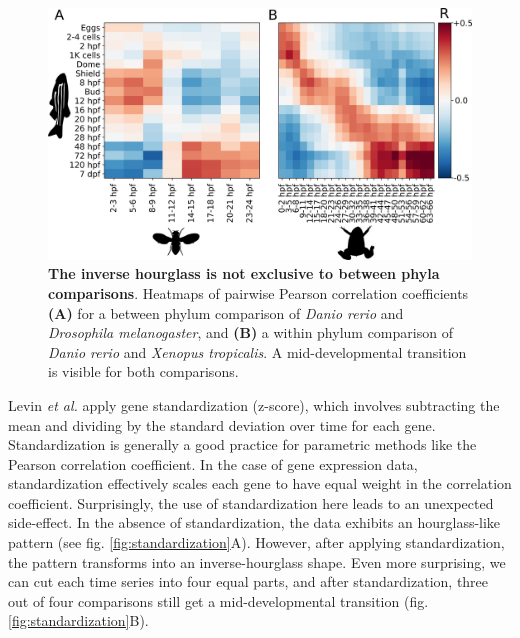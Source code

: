 \begin{figure}[H]
    \includegraphics[width=\linewidth]{ch.hourglass/images/within_between_phyla.png}
    \caption{\textbf{The inverse hourglass is not exclusive to between phyla comparisons}. Heatmaps of pairwise Pearson correlation coefficients \textbf{(A)} for a between phylum comparison of \textit{Danio rerio} and \textit{Drosophila melanogaster}, and \textbf{(B)} a within phylum comparison of \textit{Danio rerio} and \textit{Xenopus tropicalis}. A mid-developmental transition is visible for both comparisons.}
    \label{fig:within_phylum}
\end{figure}

Levin \textit{et al.} apply gene standardization (z-score), which involves subtracting the mean and dividing by the standard deviation over time for each gene. Standardization is generally a good practice for parametric methods like the Pearson correlation coefficient. In the case of gene expression data, standardization effectively scales each gene to have equal weight in the correlation coefficient. Surprisingly, the use of standardization here leads to an unexpected side-effect. In the absence of standardization, the data exhibits an hourglass-like pattern (see fig. \ref{fig:standardization}A). However, after applying standardization, the pattern transforms into an inverse-hourglass shape. Even more surprising, we can cut each time series into four equal parts, and after standardization, three out of four comparisons still get a mid-developmental transition (fig. \ref{fig:standardization}B). 

